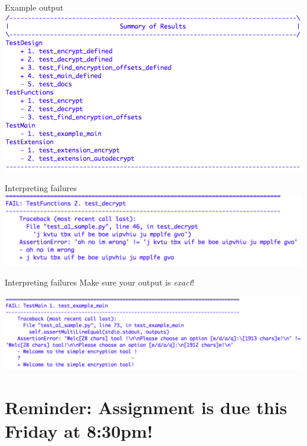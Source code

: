 \documentclass[week2]{csse1001}
\begin{document}
\begin{topic}{Example output}
\includegraphics[scale=0.9\textheight]{testsa1/overview}
\end{topic}

\begin{topic}{Interpreting failures}
\includegraphics[scale=0.9\textheight]{testsa1/fail}
\end{topic}

\begin{topic}{Interpreting failures}
Make sure your output is \textit{exact}!

\includegraphics[scale=0.8\textheight]{testsa1/fail2}
\end{topic}

\section{Reminder: Assignment is due this Friday at 8:30pm!}
\end{document}

